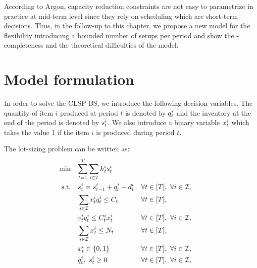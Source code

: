 \medskip


According to Argon, capacity reduction constraints are not easy to parametrize in practice at mid-term level since they rely on scheduling which are short-term decisions. Thus, in the follow-up to this chapter, we propose a new model for the flexibility introducing a bounded number of setups per period and show the \NP-completeness and the theoretical difficulties of the model.



\section{Model formulation}


In order to solve the CLSP-BS, we introduce the following decision variables. The quantity of item $i$ produced at period $t$ is denoted by $q_t^i$ and the inventory at the end of the period is denoted by $s_t^i$. We also introduce a binary variable $x_t^i$ which takes the value 1 if the item $i$ is produced during period $t$.

The lot-sizing problem can be written as:
\begin{subequations}\label{eq:CLSP-BS}
  \begin{align}
    \min\quad & \rlap{$\ds \sum_{t=1}^{\horizon} \sum_{i\in\REF} \holding_t^i \inventory_t^i$}
    \label{eq:CLSP-BS:objective}
    \\
    \st\quad & \ds \inventory_t^i = \inventory_{t-1}^i + \quantity_t^i - \demand_t^i && \forall t\in\range{\horizon},\ \forall i\in\REF,
    \label{eq:CLSP-BS:inventory-dynamic}
    \\
    & \ds \sum_{i\in\REF} \rate_t^i \quantity_t^i \le \capacity_t && \forall t\in\range{\horizon},
    \label{eq:CLSP-BS:capacity}
    \\
    & \ds \rate_t^i \quantity_t^i \le \capacity_t^i \setup_t^i && \forall t\in\range{\horizon},\ \forall i\in\REF,
    \label{eq:CLSP-BS:big-M}
    \\
    & \ds \sum_{i\in\REF} \setup_t^i \le \nbsetups_t && \forall t\in\range{\horizon},
    \label{eq:CLSP-BS:setups}
    \\
    & \ds \setup_t^i \in \crbracket{0,1} && \forall t\in\range{\horizon},\ \forall i\in\REF,
    \label{eq:CLSP-BS:boolean}
    \\
    & \ds \quantity_t^i,\ \inventory_t^i \ge 0 && \forall t\in\range{\horizon},\ \forall i\in\REF,
    \label{eq:CLSP-BS:positivity}
  \end{align}
\end{subequations}

